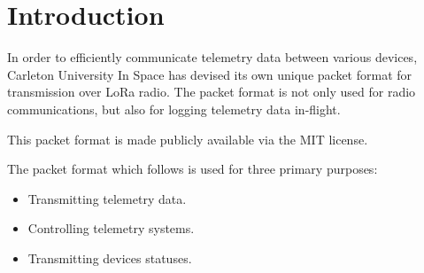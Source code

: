 \section{Introduction} \label{sec:introduction}

In order to efficiently communicate telemetry data between various devices, Carleton University In Space has devised
its own unique packet format for transmission over LoRa radio. The packet format is not only used for radio
communications, but also for logging telemetry data in-flight.

This packet format is made publicly available via the MIT license.

The packet format which follows is used for three primary purposes:

\begin{itemize}
    \item Transmitting telemetry data.
    \item Controlling telemetry systems.
    \item Transmitting devices statuses.
\end{itemize}
